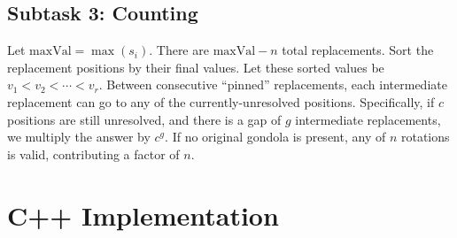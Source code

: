 \documentclass[11pt,a4paper]{article}
\begin{document}
\subsection{Subtask 3: Counting}

Let $\text{maxVal} = \max(s_i)$. There are $\text{maxVal} - n$ total replacements. Sort the replacement positions by their final values. Let these sorted values be $v_1 < v_2 < \cdots < v_r$. Between consecutive ``pinned'' replacements, each intermediate replacement can go to any of the currently-unresolved positions. Specifically, if $c$ positions are still unresolved, and there is a gap of $g$ intermediate replacements, we multiply the answer by $c^g$. If no original gondola is present, any of $n$ rotations is valid, contributing a factor of $n$.

\section{C++ Implementation}
\end{document}
